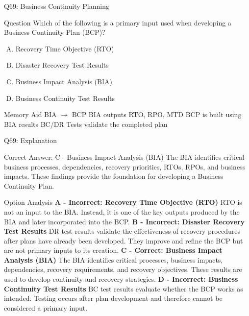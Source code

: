 \documentclass{beamer}
\begin{document}
	
	\begin{frame}{Q69: Business Continuity Planning} \begin{block}{Question} Which of the following is a primary input used when developing a Business Continuity Plan (BCP)? \end{block} \begin{enumerate}[(A)] \item Recovery Time Objective (RTO) \item Disaster Recovery Test Results \item Business Impact Analysis (BIA) \item Business Continuity Test Results \end{enumerate} \begin{block}{Memory Aid} BIA $\rightarrow$ BCP BIA outputs RTO, RPO, MTD BCP is built using BIA results BC/DR Tests validate the completed plan \end{block} \end{frame} \begin{frame}{Q69: Explanation} \footnotesize \begin{block}{Correct Answer: C - Business Impact Analysis (BIA)} The BIA identifies critical business processes, dependencies, recovery priorities, RTOs, RPOs, and business impacts. These findings provide the foundation for developing a Business Continuity Plan. \end{block} \begin{block}{Option Analysis} \textbf{A - Incorrect: Recovery Time Objective (RTO)} RTO is not an input to the BIA. Instead, it is one of the key outputs produced by the BIA and later incorporated into the BCP. \vspace{0.15cm} \textbf{B - Incorrect: Disaster Recovery Test Results} DR test results validate the effectiveness of recovery procedures after plans have already been developed. They improve and refine the BCP but are not primary inputs to its creation. \vspace{0.15cm} \textbf{C - Correct: Business Impact Analysis (BIA)} The BIA identifies critical processes, business impacts, dependencies, recovery requirements, and recovery objectives. These results are used to develop continuity and recovery strategies. \vspace{0.15cm} \textbf{D - Incorrect: Business Continuity Test Results} BC test results evaluate whether the BCP works as intended. Testing occurs after plan development and therefore cannot be considered a primary input. \end{block}  \end{frame}
	
\end{document}
